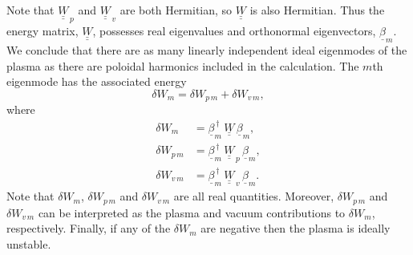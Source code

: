 \documentclass[12pt,prb,aps]{revtex4-1}
\begin{document}
Note that $\underline{\underline{W}}_{\,p}$ and $\underline{\underline{W}}_{\,v}$ are both Hermitian, so $\underline{\underline{W}}$ is also
Hermitian. Thus the energy matrix, $\underline{\underline{W}}$, possesses real eigenvalues and orthonormal eigenvectors, $\underline{\beta}_m$. 
We conclude that there are as many linearly independent ideal eigenmodes of the plasma as there are poloidal harmonics included in the calculation. The $m$th
eigenmode has the associated energy
\begin{equation}
\delta W_m = \delta W_{p\,m} + \delta W_{v\,m},
\end{equation}
where 
\begin{align}
\delta W_m &= \underline{\beta}_m^{\,\dag}\,\underline{\underline{W}}\, \underline{\beta}_m,\\[0.5ex]
\delta W_{p\,m} &= \underline{\beta}_m^{\,\dag}\,\underline{\underline{W}}_{\,p}\, \underline{\beta}_m,\\[0.5ex]
\delta W_{v\,m} &= \underline{\beta}_m^{\,\dag}\,\underline{\underline{W}}_{\,v}\, \underline{\beta}_m.
\end{align}
Note that $\delta W_m$, $\delta W_{p\,m}$ and $\delta W_{v\,m}$ are all real quantities. Moreover, $\delta W_{p\,m}$ and $\delta W_{v\,m}$ can be interpreted as the
plasma and vacuum contributions to $\delta W_m$, respectively. Finally, if any of the $\delta W_m$ are negative then the plasma is ideally unstable.\cite{freidberg,ideal}
\end{document}
